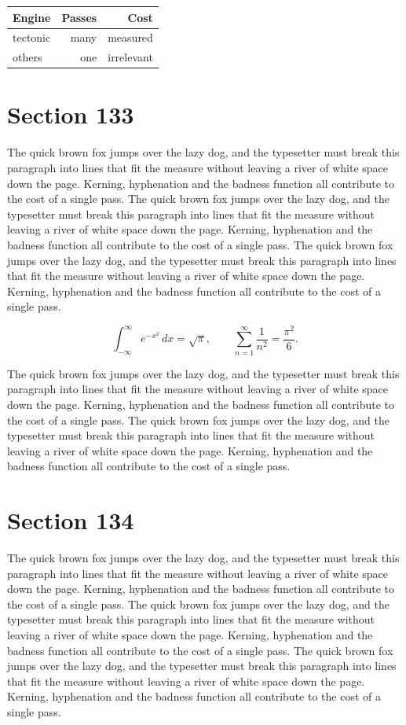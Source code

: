 \documentclass{article}
\begin{document}
\begin{center}
\begin{tabular}{lrr}
\toprule
Engine & Passes & Cost \\
\midrule
tectonic & many & measured \\
others & one & irrelevant \\
\bottomrule
\end{tabular}
\end{center}

\section{Section 133}
The quick brown fox jumps over the lazy dog, and the typesetter must break this paragraph into lines that fit the measure without leaving a river of white space down the page. Kerning, hyphenation and the badness function all contribute to the cost of a single pass. The quick brown fox jumps over the lazy dog, and the typesetter must break this paragraph into lines that fit the measure without leaving a river of white space down the page. Kerning, hyphenation and the badness function all contribute to the cost of a single pass. The quick brown fox jumps over the lazy dog, and the typesetter must break this paragraph into lines that fit the measure without leaving a river of white space down the page. Kerning, hyphenation and the badness function all contribute to the cost of a single pass. 

\begin{equation}
\int_{-\infty}^{\infty} e^{-x^{2}}\,dx = \sqrt{\pi}, \qquad
\sum_{n=1}^{\infty} \frac{1}{n^{2}} = \frac{\pi^{2}}{6}.
\end{equation}

The quick brown fox jumps over the lazy dog, and the typesetter must break this paragraph into lines that fit the measure without leaving a river of white space down the page. Kerning, hyphenation and the badness function all contribute to the cost of a single pass. The quick brown fox jumps over the lazy dog, and the typesetter must break this paragraph into lines that fit the measure without leaving a river of white space down the page. Kerning, hyphenation and the badness function all contribute to the cost of a single pass. 
\section{Section 134}
The quick brown fox jumps over the lazy dog, and the typesetter must break this paragraph into lines that fit the measure without leaving a river of white space down the page. Kerning, hyphenation and the badness function all contribute to the cost of a single pass. The quick brown fox jumps over the lazy dog, and the typesetter must break this paragraph into lines that fit the measure without leaving a river of white space down the page. Kerning, hyphenation and the badness function all contribute to the cost of a single pass. The quick brown fox jumps over the lazy dog, and the typesetter must break this paragraph into lines that fit the measure without leaving a river of white space down the page. Kerning, hyphenation and the badness function all contribute to the cost of a single pass. 
\end{document}
